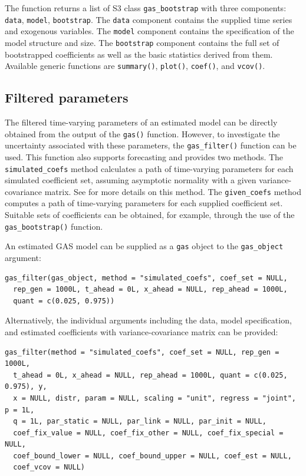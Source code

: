 The function returns a list of S3 class \texttt{gas\_bootstrap} with three components: \texttt{data}, \texttt{model}, \texttt{bootstrap}. The \texttt{data} component contains the supplied time series and exogenous variables. The \texttt{model} component contains the specification of the model structure and size. The \texttt{bootstrap} component contains the full set of bootstrapped coefficients as well as the basic statistics derived from them. Available generic functions are \texttt{summary()}, \texttt{plot()}, \texttt{coef()}, and \texttt{vcov()}.

\subsection{Filtered parameters}\label{filtered-parameters}

The filtered time-varying parameters of an estimated model can be directly obtained from the output of the \texttt{gas()} function. However, to investigate the uncertainty associated with these parameters, the \texttt{gas\_filter()} function can be used. This function also supports forecasting and provides two methods. The \texttt{simulated\_coefs} method calculates a path of time-varying parameters for each simulated coefficient set, assuming asymptotic normality with a given variance-covariance matrix. See \citet{Blasques2016a} for more details on this method. The \texttt{given\_coefs} method computes a path of time-varying parameters for each supplied coefficient set. Suitable sets of coefficients can be obtained, for example, through the use of the \texttt{gas\_bootstrap()} function.

An estimated GAS model can be supplied as a \texttt{gas} object to the \texttt{gas\_object} argument:

\begin{verbatim}
gas_filter(gas_object, method = "simulated_coefs", coef_set = NULL,
  rep_gen = 1000L, t_ahead = 0L, x_ahead = NULL, rep_ahead = 1000L,
  quant = c(0.025, 0.975))
\end{verbatim}

Alternatively, the individual arguments including the data, model specification, and estimated coefficients with variance-covariance matrix can be provided:

\begin{verbatim}
gas_filter(method = "simulated_coefs", coef_set = NULL, rep_gen = 1000L,
  t_ahead = 0L, x_ahead = NULL, rep_ahead = 1000L, quant = c(0.025, 0.975), y,
  x = NULL, distr, param = NULL, scaling = "unit", regress = "joint", p = 1L,
  q = 1L, par_static = NULL, par_link = NULL, par_init = NULL,
  coef_fix_value = NULL, coef_fix_other = NULL, coef_fix_special = NULL,
  coef_bound_lower = NULL, coef_bound_upper = NULL, coef_est = NULL,
  coef_vcov = NULL)
\end{verbatim}


